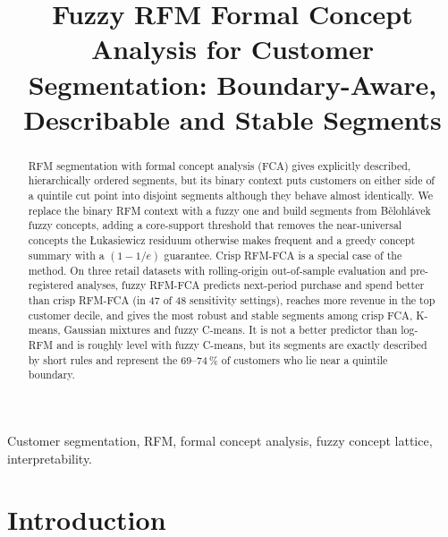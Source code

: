 \documentclass[conference]{IEEEtran}
\begin{document}
\title{Fuzzy RFM Formal Concept Analysis for Customer Segmentation: Boundary-Aware, Describable and Stable Segments}

\author{
\and
{}
\and
{}
}

\maketitle

\begin{abstract}
RFM segmentation with formal concept analysis (FCA) gives explicitly described, hierarchically ordered segments, but its binary context puts customers on either side of a quintile cut point into disjoint segments although they behave almost identically. We replace the binary RFM context with a fuzzy one and build segments from Bělohlávek fuzzy concepts, adding a core-support threshold that removes the near-universal concepts the Łukasiewicz residuum otherwise makes frequent and a greedy concept summary with a $(1-1/e)$ guarantee. Crisp RFM-FCA is a special case of the method. On three retail datasets with rolling-origin out-of-sample evaluation and pre-registered analyses, fuzzy RFM-FCA predicts next-period purchase and spend better than crisp RFM-FCA (in 47 of 48 sensitivity settings), reaches more revenue in the top customer decile, and gives the most robust and stable segments among crisp FCA, K-means, Gaussian mixtures and fuzzy C-means. It is not a better predictor than log-RFM and is roughly level with fuzzy C-means, but its segments are exactly described by short rules and represent the 69--74\,\% of customers who lie near a quintile boundary.
\end{abstract}

\begin{IEEEkeywords}
Customer segmentation, RFM, formal concept analysis, fuzzy concept lattice, interpretability.
\end{IEEEkeywords}

\section{Introduction}
\end{document}
